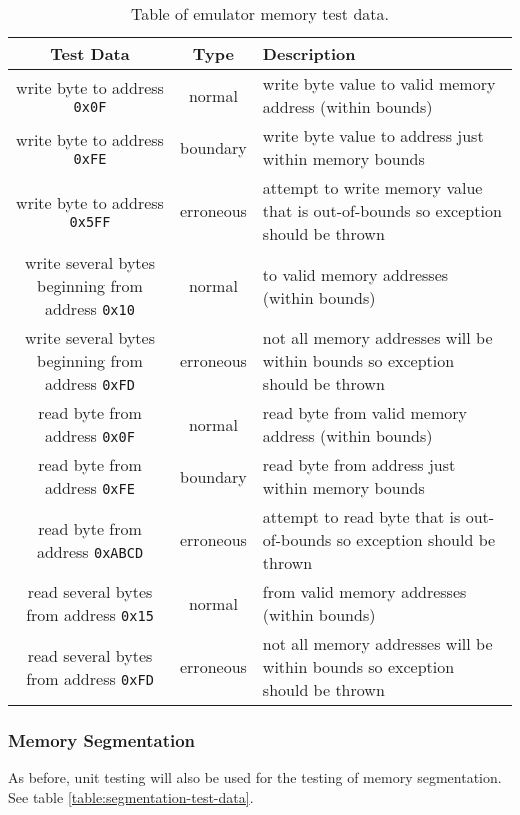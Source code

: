         \begin{table}
            \begin{tabular}{ | c | c | m{} | }
                \hline
                Test Data & Type & Description \\
                \hline
                write byte to address \texttt{0x0F} & normal & write byte value to valid memory address (within bounds) \\
                write byte to address \texttt{0xFE} & boundary & write byte value to address just within memory bounds \\
                write byte to address \texttt{0x5FF} & erroneous & attempt to write memory value that is out-of-bounds so exception should be thrown \\
                write several bytes beginning from address \texttt{0x10} & normal & to valid memory addresses (within bounds) \\
                write several bytes beginning from address \texttt{0xFD} & erroneous & not all memory addresses will be within bounds so exception should be thrown \\
                read byte from address \texttt{0x0F} & normal & read byte from valid memory address (within bounds) \\
                read byte from address \texttt{0xFE} & boundary & read byte from address just within memory bounds \\
                read byte from address \texttt{0xABCD} & erroneous & attempt to read byte that is out-of-bounds so exception should be thrown \\
                read several bytes from address \texttt{0x15} & normal & from valid memory addresses (within bounds) \\
                read several bytes from address \texttt{0xFD} & erroneous & not all memory addresses will be within bounds so exception should be thrown \\
                \hline
            \end{tabular}
            \caption{Table of emulator memory test data.}
            \label{table:memory-test-data}
        \end{table}

    \subsubsection{Memory Segmentation}
        As before, unit testing will also be used for the testing of memory segmentation. See table \ref{table:segmentation-test-data}.

